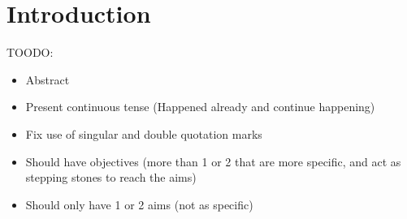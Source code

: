 \documentclass{l4proj}
\begin{document}
%
%
%
%
%
%
%
%
\chapter{Introduction}



TOODO: \begin{itemize}
    \item Abstract
    \item Present continuous tense (Happened already and continue happening)
    \item Fix use of singular and double quotation marks
    \item Should have objectives (more than 1 or 2 that are more specific, and act as stepping stones to reach the aims)
    \item Should only have 1 or 2 aims (not as specific)
\end{itemize}
\end{document}
